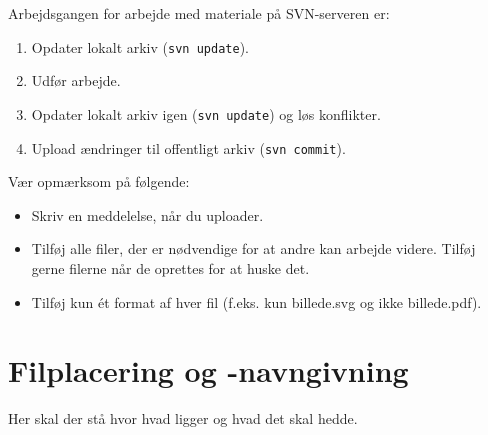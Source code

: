 \documentclass[simple,final]{../mypaper}
\begin{document}
Arbejdsgangen for arbejde med materiale på SVN-serveren er:

\begin{enumerate}
\item Opdater lokalt arkiv (\texttt{svn update}).
\item Udfør arbejde.
\item Opdater lokalt arkiv igen (\texttt{svn update}) og løs
  konflikter.
\item Upload ændringer til offentligt arkiv (\texttt{svn commit}).
\end{enumerate}

Vær opmærksom på følgende:

\begin{itemize}
\item Skriv en meddelelse, når du uploader.
\item Tilføj alle filer, der er nødvendige for at andre kan arbejde
  videre. Tilføj gerne filerne når de oprettes for at huske det.
\item Tilføj kun ét format af hver fil (f.eks. kun billede.svg og ikke
  billede.pdf).
\end{itemize}


\section{Filplacering og -navngivning}

Her skal der stå hvor hvad ligger og hvad det skal hedde.
\end{document}
